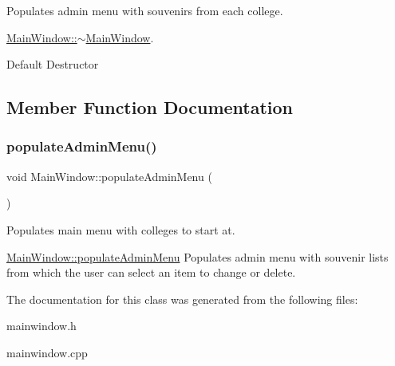 Populates admin menu with souvenirs from each college. 

\mbox{\hyperlink{class_main_window_ae98d00a93bc118200eeef9f9bba1dba7}{Main\+Window\+::$\sim$\+Main\+Window}}.

Default Destructor 

\subsection{Member Function Documentation}
\mbox{\label{class_main_window_a8fd82811fcee5c9a13ea833a474950bb}} 
\subsubsection{\texorpdfstring{populate\+Admin\+Menu()}{populateAdminMenu()}}
{\footnotesize\ttfamily void Main\+Window\+::populate\+Admin\+Menu (\begin{DoxyParamCaption}{ }\end{DoxyParamCaption})}



Populates main menu with colleges to start at. 

\mbox{\hyperlink{class_main_window_a8fd82811fcee5c9a13ea833a474950bb}{Main\+Window\+::populate\+Admin\+Menu}} Populates admin menu with souvenir lists from which the user can select an item to change or delete. 

The documentation for this class was generated from the following files\+:\begin{DoxyCompactItemize}
\item 
mainwindow.\+h\item 
mainwindow.\+cpp\end{DoxyCompactItemize}
